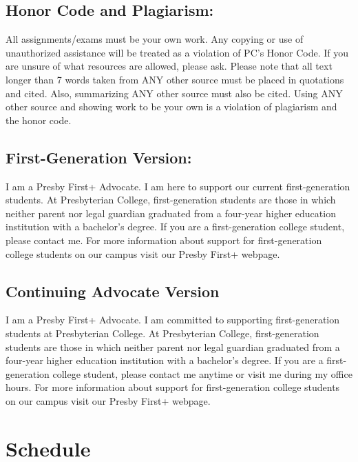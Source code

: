\documentclass[
]{book}
\theoremstyle{definition}
\theoremstyle{definition}
\theoremstyle{definition}
\theoremstyle{definition}
\theoremstyle{remark}
\begin{document}
\hypertarget{honor-code-and-plagiarism}{%
\section{Honor Code and Plagiarism:}\label{honor-code-and-plagiarism}}

All assignments/exams must be your own work. Any copying or use of unauthorized assistance will be treated as a violation of PC's Honor Code. If you are unsure of what resources are allowed, please ask. Please note that all text longer than 7 words taken from ANY other source must be placed in quotations and cited. Also, summarizing ANY other source must also be cited. Using ANY other source and showing work to be your own is a violation of plagiarism and the honor code.

\hypertarget{first-generation-version}{%
\section{First-Generation Version:}\label{first-generation-version}}

I am a Presby First+ Advocate. I am here to support our current first-generation students. At Presbyterian College, first-generation students are those in which neither parent nor legal guardian graduated from a four-year higher education institution with a bachelor's degree. If you are a first-generation college student, please contact me. For more information about support for first-generation college students on our campus visit our Presby First+ webpage.

\hypertarget{continuing-advocate-version}{%
\section{Continuing Advocate Version}\label{continuing-advocate-version}}

I am a Presby First+ Advocate. I am committed to supporting first-generation students at Presbyterian College. At Presbyterian College, first-generation students are those in which neither parent nor legal guardian graduated from a four-year higher education institution with a bachelor's degree. If you are a first-generation college student, please contact me anytime or visit me during my office hours. For more information about support for first-generation college students on our campus visit our Presby First+ webpage.

\hypertarget{schedule}{%
\chapter{Schedule}\label{schedule}}
\end{document}
